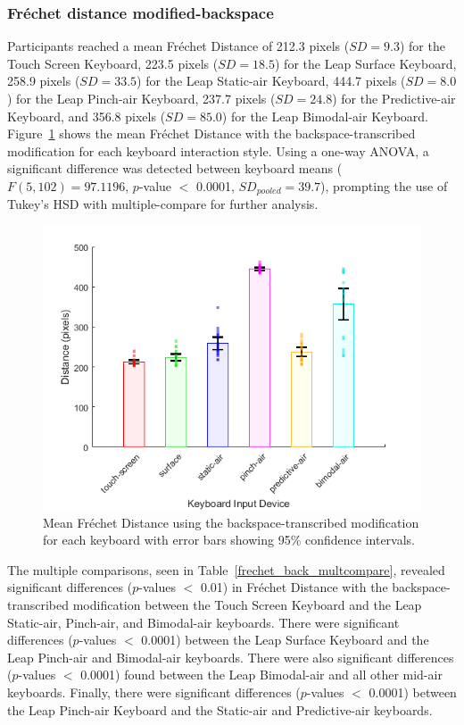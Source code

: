 \subsubsection{Fr\'echet distance modified-backspace}
Participants reached a mean Fr\'echet Distance of 212.3 pixels ($SD = 9.3$) for the Touch Screen Keyboard, 223.5 pixels ($SD = 18.5$) for the Leap Surface Keyboard, 258.9 pixels ($SD = 33.5$) for the Leap Static-air Keyboard, 444.7 pixels ($SD = 8.0$) for the Leap Pinch-air Keyboard, 237.7 pixels ($SD = 24.8$) for the Predictive-air Keyboard, and 356.8 pixels ($SD = 85.0$) for the Leap Bimodal-air Keyboard. Figure~\ref{fig_frechet_back_mean} shows the mean Fr\'echet Distance with the backspace-transcribed modification for each keyboard interaction style. Using a one-way ANOVA, a significant difference was detected between keyboard means ($F(5, 102) = 97.1196$, $p$-value $<$ 0.0001, $SD_{pooled} = 39.7$), prompting the use of Tukey's HSD with multiple-compare for further analysis.

\begin{figure}[!t]
	\centering
	\includegraphics{Figures/fig_frechet_back_mean}
	\caption[Mean Fr\'echet Distance for Modified-backspace]{Mean Fr\'echet Distance using the backspace-transcribed modification for each keyboard with error bars showing 95\% confidence intervals.}
	\label{fig_frechet_back_mean}
\end{figure}

The multiple comparisons, seen in Table~\ref{frechet_back_multcompare}, revealed significant differences ($p$-values $<$ 0.01) in Fr\'echet Distance with the backspace-transcribed modification between the Touch Screen Keyboard and the Leap Static-air, Pinch-air, and Bimodal-air keyboards. There were significant differences ($p$-values $<$ 0.0001) between the Leap Surface Keyboard and the Leap Pinch-air and Bimodal-air keyboards. There were also significant differences ($p$-values $<$ 0.0001) found between the Leap Bimodal-air and all other mid-air keyboards. Finally, there were significant differences ($p$-values $<$ 0.0001) between the Leap Pinch-air Keyboard and the Static-air and Predictive-air keyboards.

